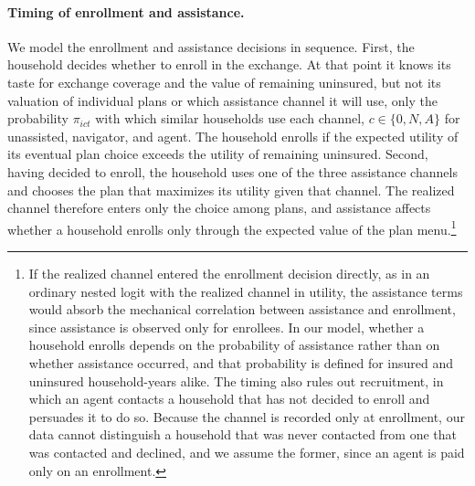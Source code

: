 \documentclass[12pt]{article}
\begin{document}
\paragraph{Timing of enrollment and assistance.} We model the enrollment and assistance decisions in sequence. First, the household decides whether to enroll in the exchange. At that point it knows its taste for exchange coverage and the value of remaining uninsured, but not its valuation of individual plans or which assistance channel it will use, only the probability $\pi_{ict}$ with which similar households use each channel, $c \in \{0, N, A\}$ for unassisted, navigator, and agent. The household enrolls if the expected utility of its eventual plan choice exceeds the utility of remaining uninsured. Second, having decided to enroll, the household uses one of the three assistance channels and chooses the plan that maximizes its utility given that channel. The realized channel therefore enters only the choice among plans, and assistance affects whether a household enrolls only through the expected value of the plan menu.\footnote{If the realized channel entered the enrollment decision directly, as in an ordinary nested logit with the realized channel in utility, the assistance terms would absorb the mechanical correlation between assistance and enrollment, since assistance is observed only for enrollees. In our model, whether a household enrolls depends on the probability of assistance rather than on whether assistance occurred, and that probability is defined for insured and uninsured household-years alike. The timing also rules out recruitment, in which an agent contacts a household that has not decided to enroll and persuades it to do so. Because the channel is recorded only at enrollment, our data cannot distinguish a household that was never contacted from one that was contacted and declined, and we assume the former, since an agent is paid only on an enrollment.}
\end{document}
